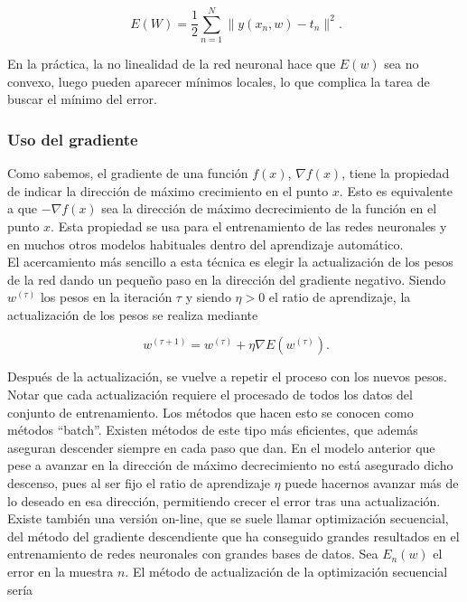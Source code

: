 \[
\ E(W)= \frac{1}{2} \sum_{n=1}^N \parallel y(x_n,w)-t_n \parallel^2 .
\]

En la práctica, la no linealidad de la red neuronal hace que $E(w)$ sea no convexo, luego pueden aparecer mínimos locales, lo que complica la tarea de buscar el mínimo del error.\\

\subsubsection{Uso del gradiente}

Como sabemos, el gradiente de una función $f(x)$, $\nabla f(x)$, tiene la propiedad de indicar la dirección de máximo crecimiento en el punto $x$. Esto es equivalente a que $-\nabla f(x)$ sea la dirección de máximo decrecimiento de la función en el punto $x$. Esta propiedad se usa para el entrenamiento de las redes neuronales y en muchos otros modelos habituales dentro del aprendizaje automático.\\

El acercamiento más sencillo a esta técnica es elegir la actualización de los pesos de la red dando un pequeño paso en la dirección del gradiente negativo. Siendo $w^{(\tau)}$ los pesos en la iteración $\tau$ y siendo $\eta>0$ el ratio de aprendizaje, la actualización de los pesos se realiza mediante

\[
\ w^{(\tau +1)}=w^{(\tau)}+\eta \nabla E(w^{(\tau)}) .
\]

Después de la actualización, se vuelve a repetir el proceso con los nuevos pesos. Notar que cada actualización requiere el procesado de todos los datos del conjunto de entrenamiento. Los métodos que hacen esto se conocen como métodos ``batch''. Existen métodos de este tipo más eficientes, que además aseguran descender siempre en cada paso que dan. En el modelo anterior que pese a avanzar en la dirección de máximo decrecimiento no está asegurado dicho descenso, pues al ser fijo el ratio de aprendizaje $\eta$ puede hacernos avanzar más de lo deseado en esa dirección, permitiendo crecer el error tras una actualización.\\

Existe también una versión on-line, que se suele llamar optimización secuencial, del método del gradiente descendiente que ha conseguido grandes resultados en el entrenamiento de redes neuronales con grandes bases de datos. Sea $E_n(w)$ el error en la muestra $n$. El método de actualización de la optimización secuencial sería

